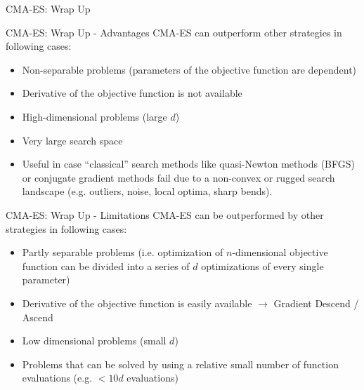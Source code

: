 \documentclass[11pt,compress,t,notes=noshow, xcolor=table]{beamer}
\begin{document}
\begin{frame}{CMA-ES: Wrap Up}
\begin{figure}
\begin{overprint}
\centering
{}
\end{overprint}
\end{figure}
\end{frame}


\begin{vbframe}{CMA-ES: Wrap Up - Advantages}
CMA-ES can outperform other strategies in following cases:

\begin{itemize}
\setlength\itemsep{1.2em}
\item Non-separable problems (parameters of the objective function are dependent)
\item Derivative of the objective function is not available
\item High-dimensional problems (large $d$)
\item Very large search space
\item Useful in case \enquote{classical} search methods like quasi-Newton methods (BFGS) or conjugate gradient methods fail due to a non-convex or rugged search landscape (e.g. outliers, noise, local optima, sharp bends).
\end{itemize}
\end{vbframe}


\begin{vbframe}{CMA-ES: Wrap Up - Limitations}
CMA-ES can be outperformed by other strategies in following cases:

\begin{itemize}
\setlength\itemsep{1.2em}
\item Partly separable problems (i.e. optimization of $n$-dimensional objective function can be divided into a series of $d$ optimizations of every single parameter)
\item Derivative of the objective function is easily available $\rightarrow$ Gradient Descend / Ascend
\item Low dimensional problems (small $d$)
\item Problems that can be solved by using a relative small number of function evaluations (e.g. $< 10 d$ evaluations)
\end{itemize}
\end{vbframe}
\end{document}
